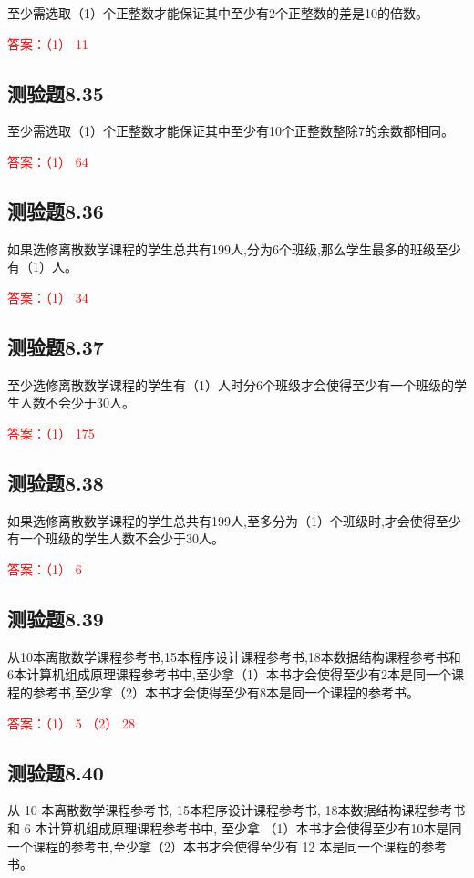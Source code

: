 \documentclass[UTF8, heading=true]{ctexart}
\begin{document}
至少需选取（1）个正整数才能保证其中至少有2个正整数的差是10的倍数。

\textcolor{red}{答案：（1） 11}

\subsection{测验题8.35}
至少需选取（1）个正整数才能保证其中至少有10个正整数整除7的余数都相同。

\textcolor{red}{答案：（1） 64}

\subsection{测验题8.36}
如果选修离散数学课程的学生总共有199人,分为6个班级,那么学生最多的班级至少有（1）人。

\textcolor{red}{答案：（1） 34}

\subsection{测验题8.37}

至少选修离散数学课程的学生有（1）人时分6个班级才会使得至少有一个班级的学生人数不会少于30人。

\textcolor{red}{答案：（1） 175}

\subsection{测验题8.38}

如果选修离散数学课程的学生总共有199人,至多分为（1）个班级时,才会使得至少有一个班级的学生人数不会少于30人。

\textcolor{red}{答案：（1） 6}


\subsection{测验题8.39}

从10本离散数学课程参考书,15本程序设计课程参考书,18本数据结构课程参考书和6本计算机组成原理课程参考书中,至少拿（1）本书才会使得至少有2本是同一个课程的参考书,至少拿（2）本书才会使得至少有8本是同一个课程的参考书。

\textcolor{red}{答案：（1） 5 （2） 28}

\subsection{测验题8.40}

从 10 本离散数学课程参考书, 15本程序设计课程参考书, 18本数据结构课程参考书和 6 本计算机组成原理课程参考书中, 至少拿
（1）本书才会使得至少有10本是同一个课程的参考书,至少拿（2）本书才会使得至少有 12 本是同一个课程的参考书。
\end{document}
